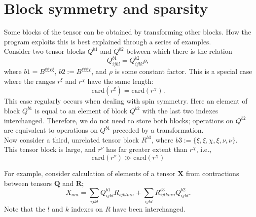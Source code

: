 \section {Block symmetry and sparsity }

\noindent Some blocks of the tensor can be obtained by transforming other
blocks. How the program exploits this is best explained through a series of
examples.\\ 

\noindent Consider two tensor blocks $Q^{b1}$ and $Q^{b2}$ between which there is the relation
\begin{equation}
Q^{b1}_{ijkl} = Q^{b2}_{ijlk}\rho,
\label{eqn:Qsymm}
\end{equation}
where $b1 = B^{\xi\xi\chi\xi }$, $b2 := B^{\xi\xi\xi\chi }$, and $\rho$ is some
constant factor. This is a special case where the ranges $r^{\xi}$ and
$r^{\chi}$ have the same length:
\begin{equation}
\text{card}(r^{\xi}) = \text{card}(r^{\chi}).
\end{equation}
This case regularly occurs when dealing with spin symmetry. Here an element of block $Q^{b1}$ is equal to an element of block $Q^{b2}$ with the last two indexes interchanged.
Therefore, we do not need to store both blocks; operations on $Q^{b2}$ are equivalent to operations on $Q^{b1}$ preceded by a transformation.\\

\noindent Now consider a third, unrelated tensor block $R^{b3}$, where $b3 := \{\xi, \xi, \chi, \xi, \nu, \nu \}$. 
This tensor block is large, and $r^{\nu}$ has far greater extent than $r^{\chi}$, i.e.,
\begin{equation}
\text{card}(r^{\nu}) \gg \text{card}(r^{\chi})
\end{equation}

\noindent For example, consider calculation of elements of a tensor $\mathbf{X}$ from contractions between tensors $\mathbf{Q}$ and $\mathbf{R}$;
\begin{equation}
X_{mn} = \sum_{ijkl} Q^{b1}_{ijkl} R_{ijklmn}+ \sum_{ijkl} R^{b3}_{ijlkmn}Q^{b2}_{ijkl}.
\label{eqn:Xexample}
\end{equation} 
Note that the $l$ and $k$ indexes on $R$ have been interchanged. \\

